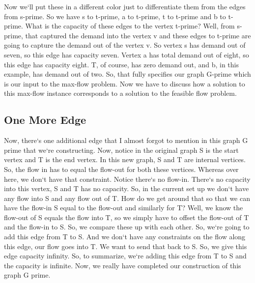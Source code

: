 Now we`ll put these in a different color just to differentiate them from the edges from s-prime.
So we have s to t-prime, a to t-prime, t to t-prime and b to t-prime.
What is the capacity of these edges to the vertex t-prime? Well, from s-prime, that captured the demand into the vertex v and these edges to t-prime are going to capture the demand out of the vertex v.
So vertex s has demand out of seven, so this edge has capacity seven.
Vertex a has total demand out of eight, so this edge has capacity eight.
T, of course, has zero demand out, and b, in this example, has demand out of two.
So, that fully specifies our graph G-prime which is our input to the max-flow problem.
Now we have to discuss how a solution to this max-flow instance corresponds to a solution to the feasible flow problem.

\subsection{One More Edge}
Now, there`s one additional edge that I almost forgot to mention in this graph G prime that we`re constructing.
Now, notice in the original graph S is the start vertex and T is the end vertex.
In this new graph, S and T are internal vertices.
So, the flow in has to equal the flow-out for both these vertices.
Whereas over here, we don`t have that constraint.
Notice there`s no flow-in.
There`s no capacity into this vertex, S and T has no capacity.
So, in the current set up we don`t have any flow into S and any flow out of T\@.
How do we get around that so that we can have the flow-in S equal to the flow-out and similarly for T? Well, we know the flow-out of S equals the flow into T, so we simply have to offset the flow-out of T and the flow-in to S\@.
So, we compare these up with each other.
So, we`re going to add this edge from T to S\@.
And we don`t have any constraints on the flow along this edge, our flow goes into T\@.
We want to send that back to S\@.
So, we give this edge capacity infinity.
So, to summarize, we`re adding this edge from T to S and the capacity is infinite.
Now, we really have completed our construction of this graph G prime.

